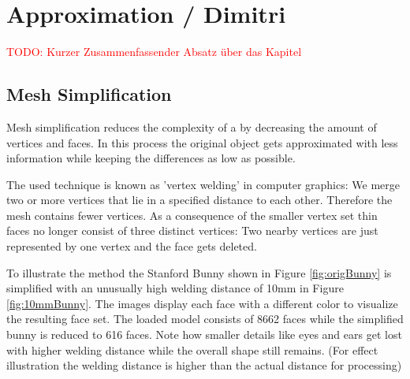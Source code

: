 \documentclass[../ClassicThesis.tex]{subfiles}
\begin{document}
\chapter{Approximation / Dimitri}\label{ch:appropximation}

\newcommand\myNotes[1]{\textcolor{red}{#1}}

\myNotes{TODO: Kurzer Zusammenfassender Absatz über das Kapitel}

\section{Mesh Simplification}














Mesh simplification reduces the complexity of a {\threedmodel} by decreasing the amount of vertices and faces. In this process the original object gets approximated with less information while keeping the differences as low as possible. 

The used technique is known as 'vertex welding' in computer graphics: We merge two or more vertices that lie in a specified distance to each other. Therefore the mesh contains fewer vertices. As a consequence of the smaller vertex set thin faces no longer consist of three distinct vertices: Two nearby vertices are just represented by one vertex and the face gets deleted.

To illustrate the method the {\threedmodel} Stanford Bunny shown in Figure \ref{fig:origBunny} is simplified with an unusually high welding distance of 10mm in Figure \ref{fig:10mmBunny}. The images display each face with a different color to visualize the resulting face set. The loaded model consists of 8662 faces while the simplified bunny is reduced to 616 faces. Note how smaller details like eyes and ears get lost with higher welding distance while the overall shape still remains. (For effect illustration the welding distance is higher than the actual distance for processing)
\end{document}
